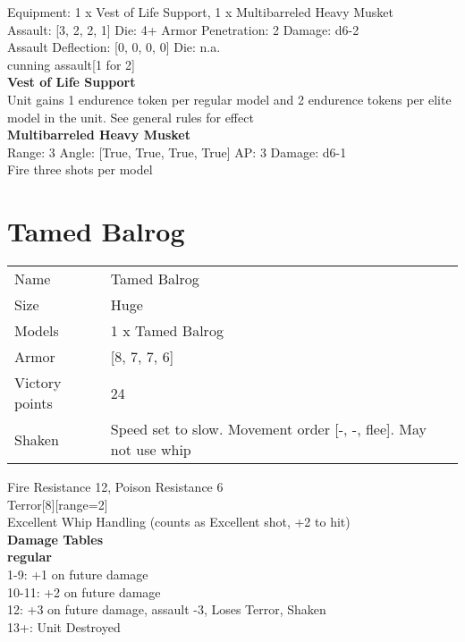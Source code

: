 Equipment: 1 x Vest of Life Support, 1 x Multibarreled Heavy Musket \\

Assault: [3, 2, 2, 1] Die: 4+ Armor Penetration: 2 Damage: d6-2 \\
Assault Deflection: [0, 0, 0, 0] Die: n.a.\\
\indent cunning assault[1 for 2]\\ 
 
{\bf Vest of Life Support } \\

Unit gains 1 endurence token per regular model  and 2 endurence tokens per elite model in the unit. See general rules for effect\\ 

{\bf Multibarreled Heavy Musket } \\

Range: 3  Angle: [True, True, True, True] AP: 3 Damage: d6-1 \\
Fire three shots per model\\ 

\clearpage


\section{ Tamed Balrog }

\begin{tabular}{ll}
  Name & Tamed Balrog \\
  Size & Huge\\
  Models & 1 x Tamed Balrog\\
  Armor & [8, 7, 7, 6]\\
  Victory points & 24\\
  Shaken & Speed set to slow. Movement order [-, -, flee]. May not use whip\\
\end{tabular}

Fire Resistance 12, Poison Resistance 6\\ 
Terror[8][range=2]\\ 
Excellent Whip Handling (counts as Excellent shot, +2 to hit)\\ 



{\bf Damage Tables} \\
 {\bf regular } \\
1-9: +1 on future damage \\
10-11: +2 on future damage \\
12: +3 on future damage, assault -3, Loses Terror, Shaken \\
13+: Unit Destroyed \\


